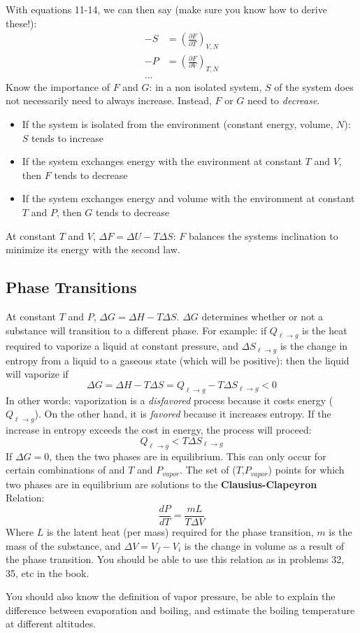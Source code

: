 \documentclass{article}
\begin{document}
With equations 11-14, we can then say (make sure you know how to derive these!):
\begin{align*}
	-S&=\left(\frac{\partial F}{\partial T}\right)_{V,N}\\
	-P&=\left(\frac{\partial F}{\partial V}\right)_{T,N}\\
	...
\end{align*}
Know the importance of $F$ and $G$: in a non isolated system, $S$ of the system does not necessarily need to always increase. Instead, $F$ or $G$ need to \textit{decrease}. 
\begin{itemize}
	\item If the system is isolated from the environment (constant energy, volume, $N$): $S$ tends to increase
	\item If the system exchanges energy with the environment at constant $T$ and $V$, then $F$ tends to decrease
	\item If the system exchanges energy and volume with the environment at constant $T$ and $P$, then $G$ tends to decrease
\end{itemize}
At constant $T$ and $V$, $\Delta F=\Delta U - T\Delta S$: $F$ balances the systems inclination to minimize its energy with the second law.\\

\subsection*{Phase Transitions}
At constant $T$ and $P$, $\Delta G = \Delta H - T\Delta S$. $\Delta G$ determines whether or not a substance will transition to a different phase. For example: if $Q_{\ell\rightarrow g}$ is the heat required to vaporize a liquid at constant pressure, and $\Delta S_{\ell\rightarrow g}$ is the change in entropy from a liquid to a gaseous state (which will be positive): then the liquid will vaporize if 
\begin{equation*}
	\Delta G = \Delta H - T\Delta S=Q_{\ell\rightarrow g}-T\Delta S_{\ell\rightarrow g}<0
\end{equation*}
In other words: vaporization is a \textit{disfavored} process because it costs energy ($Q_{\ell\rightarrow g}$). On the other hand, it is \textit{favored} because it increases entropy. If the increase in entropy exceeds the cost in energy, the process will proceed:
\begin{equation*}
	Q_{\ell\rightarrow g}<T\Delta S_{\ell\rightarrow g}
\end{equation*}
If $\Delta G=0$, then the two phases are in equilibrium. This can only occur for certain combinations of and $T$ and $P_{vapor}$. The set of ($T$,$P_{vapor}$) points for which two phases are in equilibrium are solutions to the \textbf{Clausius-Clapeyron} Relation:
\begin{equation}
	\frac{dP}{dT}=\frac{mL}{T\Delta V}
\end{equation}
Where $L$ is the latent heat (per mass) required for the phase transition, $m$ is the mass of the substance, and $\Delta V=V_f-V_i$ is the change in volume as a result of the phase transition. You should be able to use this relation as in problems 32, 35, etc in the book.

You should also know the definition of vapor pressure, be able to explain the difference between evaporation and boiling, and estimate the boiling temperature at different altitudes.
\end{document}
